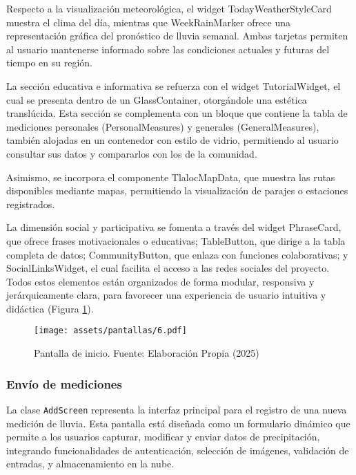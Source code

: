 Respecto a la visualización meteorológica, el widget TodayWeatherStyleCard muestra el clima del día, mientras que WeekRainMarker ofrece una representación gráfica del pronóstico de lluvia semanal. Ambas tarjetas permiten al usuario mantenerse informado sobre las condiciones actuales y futuras del tiempo en su región.

La sección educativa e informativa se refuerza con el widget TutorialWidget, el cual se presenta dentro de un GlassContainer, otorgándole una estética translúcida. Esta sección se complementa con un bloque que contiene la tabla de mediciones personales (PersonalMeasures) y generales (GeneralMeasures), también alojadas en un contenedor con estilo de vidrio, permitiendo al usuario consultar sus datos y compararlos con los de la comunidad.

Asimismo, se incorpora el componente TlalocMapData, que muestra las rutas disponibles mediante mapas, permitiendo la visualización de parajes o estaciones registrados. 

La dimensión social y participativa se fomenta a través del widget PhraseCard, que ofrece frases motivacionales o educativas; TableButton, que dirige a la tabla completa de datos;  CommunityButton, que enlaza con funciones colaborativas;  y SocialLinksWidget, el cual facilita el acceso a las redes sociales del proyecto. Todos estos elementos están organizados de forma modular, responsiva y jerárquicamente clara, para favorecer una experiencia de usuario intuitiva y didáctica (Figura \ref{pantallas6}).
\begin{figure}[h!]
\centering
  \texttt{[image: assets/pantallas/6.pdf]}
  \caption{Pantalla de inicio. Fuente: Elaboración Propia (2025)}
  \label{pantallas6}
\end{figure}

  

\newpage
\subsubsection*{Envío de mediciones}


La clase \texttt{AddScreen} %
representa la interfaz principal para el registro de una nueva medición de lluvia. Esta pantalla está diseñada como un formulario dinámico que permite a los usuarios capturar, modificar y enviar datos de precipitación, integrando funcionalidades de autenticación, selección de imágenes, validación de entradas, y almacenamiento en la nube.

